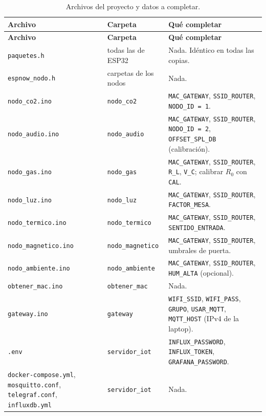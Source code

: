 \documentclass[11pt,a4paper]{article}
\newcommand{\arch}[1]{\texttt{#1}}
\begin{document}
\begin{longtable}{@{}>{\raggedright\arraybackslash}p{}>{\raggedright\arraybackslash}p{}>{\raggedright\arraybackslash}p{}@{}}
\caption{Archivos del proyecto y datos a completar.}\\
\toprule
\textbf{Archivo} & \textbf{Carpeta} & \textbf{Qu\'e completar} \\
\midrule
\endfirsthead
\toprule
\textbf{Archivo} & \textbf{Carpeta} & \textbf{Qu\'e completar} \\
\midrule
\endhead
\arch{paquetes.h} & todas las de ESP32 & Nada. Id\'entico en todas las copias. \\
\arch{espnow\_nodo.h} & carpetas de los nodos & Nada. \\
\arch{nodo\_co2.ino} & \arch{nodo\_co2} & \texttt{MAC\_GATEWAY}, \texttt{SSID\_ROUTER},
\texttt{NODO\_ID = 1}. \\
\arch{nodo\_audio.ino} & \arch{nodo\_audio} & \texttt{MAC\_GATEWAY}, \texttt{SSID\_ROUTER},
\texttt{NODO\_ID = 2}, \texttt{OFFSET\_SPL\_DB} (calibraci\'on). \\
\arch{nodo\_gas.ino} & \arch{nodo\_gas} & \texttt{MAC\_GATEWAY}, \texttt{SSID\_ROUTER},
\texttt{R\_L}, \texttt{V\_C}; calibrar $R_0$ con \texttt{CAL}. \\
\arch{nodo\_luz.ino} & \arch{nodo\_luz} & \texttt{MAC\_GATEWAY}, \texttt{SSID\_ROUTER},
\texttt{FACTOR\_MESA}. \\
\arch{nodo\_termico.ino} & \arch{nodo\_termico} & \texttt{MAC\_GATEWAY}, \texttt{SSID\_ROUTER},
\texttt{SENTIDO\_ENTRADA}. \\
\arch{nodo\_magnetico.ino} & \arch{nodo\_magnetico} & \texttt{MAC\_GATEWAY},
\texttt{SSID\_ROUTER}, umbrales de puerta. \\
\arch{nodo\_ambiente.ino} & \arch{nodo\_ambiente} & \texttt{MAC\_GATEWAY}, \texttt{SSID\_ROUTER},
\texttt{HUM\_ALTA} (opcional). \\
\arch{obtener\_mac.ino} & \arch{obtener\_mac} & Nada. \\
\arch{gateway.ino} & \arch{gateway} & \texttt{WIFI\_SSID}, \texttt{WIFI\_PASS},
\texttt{GRUPO}, \texttt{USAR\_MQTT}, \texttt{MQTT\_HOST} (IPv4 de la laptop). \\
\arch{.env} & \arch{servidor\_iot} & \texttt{INFLUX\_PASSWORD}, \texttt{INFLUX\_TOKEN},
\texttt{GRAFANA\_PASSWORD}. \\
\arch{docker-compose.yml}, \arch{mosquitto.conf}, \arch{telegraf.conf}, \arch{influxdb.yml}
& \arch{servidor\_iot} & Nada. \\

\end{longtable}
\end{document}
